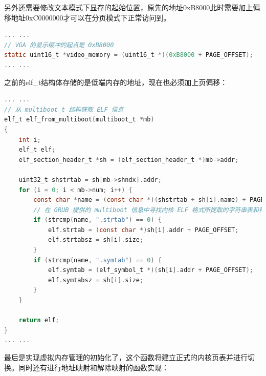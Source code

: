 \par 另外还需要修改文本模式下显存的起始位置，原先的地址0xB8000此时需要加上偏移地址0xC0000000才可以在分页模式下正常访问到。

\begin{lstlisting}[language = C, caption = drivers/console.c]
... ...
// VGA 的显示缓冲的起点是 0xB8000
static uint16_t *video_memory = (uint16_t *)(0xB8000 + PAGE_OFFSET);
... ...
\end{lstlisting}

\par 之前的elf\_t结构体存储的是低端内存的地址，现在也必须加上页偏移：

\begin{lstlisting}[language = C, caption = kern/debug/elf.c]
... ...
// 从 multiboot_t 结构获取 ELF 信息
elf_t elf_from_multiboot(multiboot_t *mb)
{
	int i;
	elf_t elf;
	elf_section_header_t *sh = (elf_section_header_t *)mb->addr;

	uint32_t shstrtab = sh[mb->shndx].addr;
	for (i = 0; i < mb->num; i++) {
		const char *name = (const char *)(shstrtab + sh[i].name) + PAGE_OFFSET;
		// 在 GRUB 提供的 multiboot 信息中寻找内核 ELF 格式所提取的字符串表和符号表
		if (strcmp(name, ".strtab") == 0) {
			elf.strtab = (const char *)sh[i].addr + PAGE_OFFSET;
			elf.strtabsz = sh[i].size;
		}
		if (strcmp(name, ".symtab") == 0) {
			elf.symtab = (elf_symbol_t *)(sh[i].addr + PAGE_OFFSET);
			elf.symtabsz = sh[i].size;
		}
	}

	return elf;
}
... ...
\end{lstlisting}

\par 最后是实现虚拟内存管理的初始化了，这个函数将建立正式的内核页表并进行切换。同时还有进行地址映射和解除映射的函数实现：

